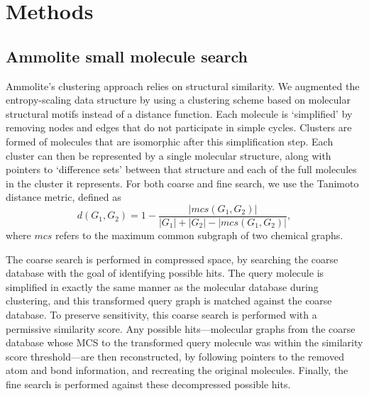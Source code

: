 \documentclass[review,preprint,12pt]{elsarticle}
\theoremstyle{definition}
\theoremstyle{remark}
\numberwithin{equation}{section}
\begin{document}
\section{Methods}

\subsection{Ammolite small molecule search}
Ammolite's clustering approach relies on structural similarity.
We augmented the entropy-scaling data structure by using a clustering scheme based on molecular structural motifs instead of a distance function.
Each molecule is `simplified' by removing nodes and edges that do not
participate in simple cycles.
Clusters are formed of molecules that are isomorphic after this simplification
step.
Each cluster can then be represented by a single molecular structure, along 
with pointers to `difference sets'  between that structure and each of the 
full molecules in the cluster it represents.
For both coarse and fine search, we use the Tanimoto distance metric, defined as
\[d(G_1,G_2) = 1 - \frac{ |mcs(G_1,G_2)| }{|G_1|+|G_2|-|mcs(G_1,G_2)|},\]
where $mcs$ refers to the maximum common subgraph of two chemical graphs. 

The coarse search is performed in compressed space, by searching 
the coarse database with the goal of identifying possible hits.
The query molecule is simplified in exactly the same manner as 
the molecular database during clustering, and this transformed query graph is 
matched against the coarse database.
To preserve sensitivity, this coarse search is performed with a permissive 
similarity score.
Any possible hits---molecular graphs from the coarse database whose MCS to 
the transformed query molecule was within the similarity score threshold---are 
then reconstructed, by following
pointers to the removed atom and bond information, and recreating the 
original molecules.
Finally, the fine search is performed against these decompressed possible 
hits.
\end{document}
